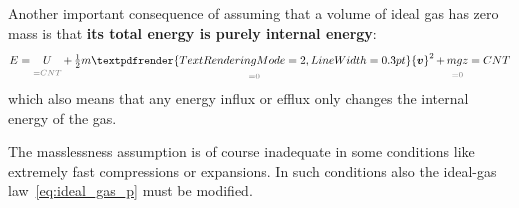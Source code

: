 \documentclass[a4paper,12pt,%
onecolumn,oneside,titlepage,%
british%
]{memoir}
\renewcommand*{\bm}[1]{\textpdfrender{TextRenderingMode=2,LineWidth=0.3pt}{\boldsymbol{#1}}}
\renewcommand*{\|}[1][]{\nonscript\:#1\vert\nonscript\:\mathopen{}}
\newcommand*{\sect}{\S}%
\renewcommand*{\autoref}[2]{\sidepar{\vspace{-1ex}\footnotesize{\color{blue}\faIcon{%
reply%
}\enspace\sect\,\ref{#1} page\,\pageref{#1}}}\textcolor{blue}{#2}}
\newcommand*{\yv}{\bm{v}}
\newcommand*{\yM}{m}%
\newcommand*{\yE}{E}
\newcommand*{\yU}{U}
\newcommand*{\yte}{T}%
\begin{document}
\smallskip

Another important consequence of assuming that a volume of ideal gas has zero mass is that \textbf{its total energy is purely internal energy}:
\begin{equation*}
  \yE = 
 \underbracket[0pt]{\yU}_{\mathcolor{midgrey}{{}=C N \yte}}
  + \underbracket[0pt]{\tfrac12\yM\yv^{2}}_{\mathcolor{midgrey}{{}=0}}
  + \underbracket[0pt]{\yM g z}_{\mathcolor{midgrey}{{}=0}}
  = C N \yte
\end{equation*}
which also means that any energy influx or efflux only changes the internal energy of the gas.

The masslessness assumption is of course inadequate in some conditions like extremely fast compressions or expansions. In such conditions also the ideal-gas law~\eqref{eq:ideal_gas_p} must be modified.

\end{document}
